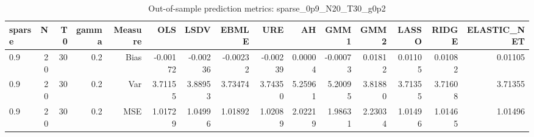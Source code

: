 \begin{table}[!htbp]\centering
\caption{Out-of-sample prediction metrics: sparse_0p9_N20_T30_g0p2}
\label{tab:table3_sparse_0p9_N20_T30_g0p2}
\begin{tabular}{lrrrrrrrrrrrrrr}
\hline
sparse & N & T0 & gamma & Measure & OLS & LSDV & EBMLE & URE & AH & GMM1 & GMM2 & LASSO & RIDGE & ELASTIC_NET \\
\hline
0.9 & 20 & 30 & 0.2 & Bias & -0.00172 & -0.00236 & -0.00232 & -0.00239 & 0.00004 & -0.00073 & 0.01812 & 0.01105 & 0.01082 & 0.01105 \\
0.9 & 20 & 30 & 0.2 & Var & 3.71155 & 3.88953 & 3.73474 & 3.74350 & 5.25961 & 5.20095 & 3.81880 & 3.71355 & 3.71608 & 3.71355 \\
0.9 & 20 & 30 & 0.2 & MSE & 1.01729 & 1.04996 & 1.01892 & 1.02089 & 2.02219 & 1.98631 & 2.23034 & 1.01496 & 1.01465 & 1.01496 \\
\hline
\end{tabular}
\end{table}

